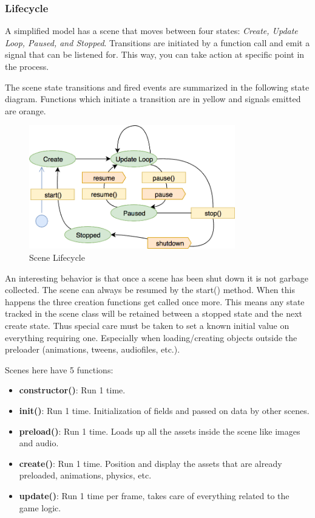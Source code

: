 \subsubsection{Lifecycle}
A simplified model has a scene that moves between four states: \textit{Create, Update Loop, Paused, and Stopped}.
Transitions are initiated by a function call and emit a signal that can be listened for.
This way, you can take action at specific point in the process.

The scene state transitions and fired events are summarized in the following state diagram.
Functions which initiate a transition are in yellow and signals emitted are orange.

\begin{figure}[H]
    \centering
    \includegraphics[width=0.8\textwidth]{figures/lifecycle}
    \caption{Scene Lifecycle \cite{phaser-guides-scenes}}
    \label{fig:lifecycle}
\end{figure}

An interesting behavior is that once a scene has been shut down it is not garbage collected.
The scene can always be resumed by the start() method.
When this happens the three creation functions get called once more.
This means any state tracked in the scene class will be retained between a stopped state and the next create state.
Thus special care must be taken to set a known initial value on everything requiring one.
Especially when loading/creating objects outside the preloader (animations, tweens, audiofiles, etc.).

Scenes here have 5 functions:

\begin{itemize}
    \item \textbf{constructor()}: Run 1 time.
    \item \textbf{init()}: Run 1 time. Initialization of fields and passed on data by other scenes.
    \item \textbf{preload()}: Run 1 time. Loads up all the assets inside the scene like images and audio.
    \item \textbf{create()}: Run 1 time. Position and display the assets that are already preloaded, animations, physics, etc.
    \item \textbf{update()}: Run 1 time per frame, takes care of everything related to the game logic.
\end{itemize}

